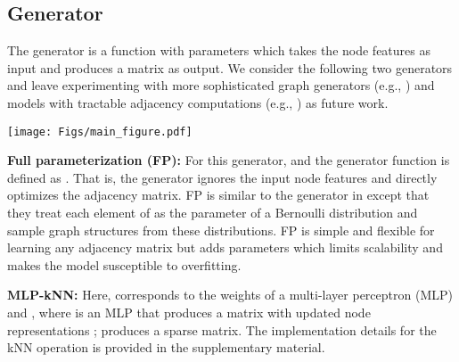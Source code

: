 \documentclass{article}
\begin{document}
\subsection{Generator} \label{sec:generator}
The generator is a function  with parameters  which takes the node features  as input and produces a matrix  as output. We consider the following two generators and leave experimenting with more sophisticated graph generators (e.g., \citep{you2018graphrnn,liu2019graph,liao2019efficient}) and models with tractable adjacency computations (e.g., \citep{choromanski2020rethinking}) as future work.

\begin{figure*}[t]
   \centering
   \texttt{[image: Figs/main\_figure.pdf]}
   \caption{\label{fig:slaps} Overview of SLAPS. At the top, a generator receives the node features and produces a non-symmetric, non-normalized adjacency having (possibly) both positive and negative values (Section~\ref{sec:generator}). The adjacency processor makes the values positive, symmetrizes and normalizes the adjacency (Section~\ref{sec:processor}). The resulting adjacency and the node features go into  which predicts the node classes (Section~\ref{sec:classifier}). At the bottom, some noise is added to the node features. The resulting noisy features and the generated adjacency go into  which then denoises the features (Section~\ref{sec:self-supervision}).}
\end{figure*}

\textbf{Full parameterization (FP):} For this generator,  and the generator function is defined as . That is, the generator ignores the input node features and directly optimizes the adjacency matrix. 
FP is similar to the generator in \cite{franceschi2019learning} except that they treat each element of  as the parameter of a Bernoulli distribution and sample graph structures from these distributions. FP is simple and flexible for learning any adjacency matrix but adds  parameters which limits scalability and makes the model susceptible to overfitting.

\textbf{MLP-kNN:} Here,  corresponds to the weights of a multi-layer perceptron (MLP) and , where  is an MLP that produces a matrix with updated node representations ;  produces a sparse matrix. The implementation details for the kNN operation is provided in the supplementary material. 
\end{document}

